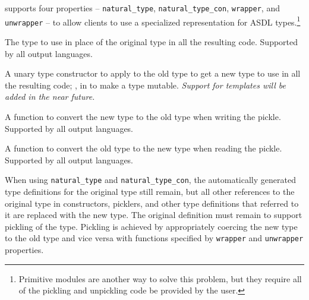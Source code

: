 \asdlgen{} supports four properties -- \lstinline!natural_type!,
\lstinline!natural_type_con!, \lstinline!wrapper!, and \lstinline!unwrapper! --
to allow clients to use a specialized representation for ASDL types.\footnote{
  Primitive modules are another way to solve this problem, but they require
  all of the pickling and unpickling code be provided by the user.
}
\begin{description} 
    The type to use in place of the original type in all the resulting code. 
    Supported by all output languages.

    A unary type constructor to apply to the old type to get a new type to
    use in all the resulting code; \eg{}, \lstinline@ref@ in \sml to make a type
    mutable.
    \emph{Support for \Cplusplus{} templates will be added in the near future.}

    A function to convert the new type to the old type when writing the
    pickle. Supported by all output languages.

    A function to convert the old type to the new type when reading the pickle. 
    Supported by all output languages. 
\end{description}%

When using \lstinline!natural_type! and \lstinline!natural_type_con!,
the automatically generated type definitions for the original type still
remain, but all other references to the original type in constructors, picklers,
and other type definitions that referred to it are replaced with the new type.
The original definition must remain to support pickling of the type. Pickling
is achieved by appropriately coercing the new type to the old type and vice
versa with functions specified by \lstinline!wrapper! and \lstinline!unwrapper! 
properties.


